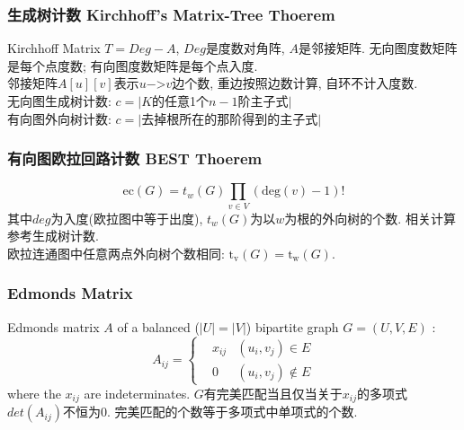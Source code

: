 \subsubsection{生成树计数 Kirchhoff's Matrix-Tree Thoerem}
    Kirchhoff Matrix $T=Deg-A$, $Deg$是度数对角阵, $A$是邻接矩阵. 无向图度数矩阵是每个点度数; 有向图度数矩阵是每个点入度.\\
    邻接矩阵$A[u][v]$表示$u$−>$v$边个数, 重边按照边数计算, 自环不计入度数.\\
    无向图生成树计数: $c=|K$的任意1个$n−1$阶主子式$|$\\
    有向图外向树计数: $c=|$去掉根所在的那阶得到的主子式$|$
\subsubsection{有向图欧拉回路计数 BEST Thoerem}
        \[ \mathrm{ec}(G) = t_w(G)\prod_{v \in{V}}(\mathrm{deg}(v) - 1)! \]
        其中$deg$为入度(欧拉图中等于出度), $t_w(G)$为以$w$为根的外向树的个数. 相关计算参考生成树计数.\\
        欧拉连通图中任意两点外向树个数相同: $\mathrm{t_v}(G) = \mathrm{t_w}(G)$.
    \subsubsection{Edmonds Matrix}
        Edmonds matrix $A$ of a balanced ($|U|=|V|$) bipartite graph $G=(U,V,E)$ : 
        \[A_{ij}=\left\{
            \begin{aligned}
                & x_{ij} & (u_i,v_j)\in E\\
                & 0 & (u_i,v_j)\notin E
            \end{aligned}
            \right.\]
        where the $x_{ij}$ are indeterminates. $G$有完美匹配当且仅当关于$x_{ij}$的多项式$det(A_{ij})$不恒为$0$.
        完美匹配的个数等于多项式中单项式的个数.
